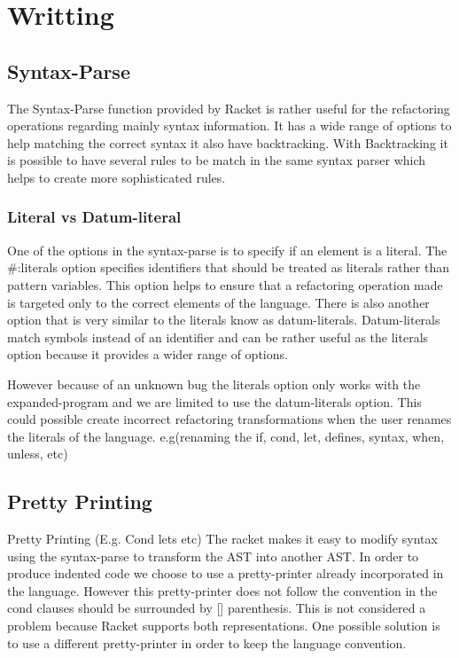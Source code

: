 \section{Writting}
\subsection{Syntax-Parse}
The Syntax-Parse function provided by Racket is rather useful for the refactoring
operations regarding mainly syntax information.
It has a wide range of options to help matching the correct syntax it also have
backtracking. With Backtracking it is possible to have several rules to be match
in the same syntax parser which helps to create more sophisticated rules.

\subsubsection{Literal vs Datum-literal}
One of the options in the syntax-parse is to specify if an element is a literal.
The #:literals option specifies identifiers that should be treated as literals
rather than pattern variables. This option helps to ensure that a refactoring
operation made is targeted only to the correct elements of the language. There is
also another option that is very similar to the literals know as datum-literals.
Datum-literals match symbols instead of an identifier and can be rather useful as
the literals option because it provides a wider range of options.

However because of an unknown bug the literals option only works with the expanded-program
and we are limited to use the datum-literals option. This could possible create
incorrect refactoring transformations when the user renames the literals of the
language. e.g(renaming the if, cond, let, defines, syntax, when, unless, etc)

\subsection{Pretty Printing}

Pretty Printing (E.g. Cond lets etc)
The racket makes it easy to modify syntax using the syntax-parse to transform the
AST into another AST.
In order to produce indented code we choose to use a pretty-printer already
incorporated in the language.
However this pretty-printer does not follow the convention in the cond clauses
should be surrounded by [] parenthesis. This is not considered a problem because
Racket supports both representations.
One possible solution is to use a different pretty-printer in
order to keep the language convention.



